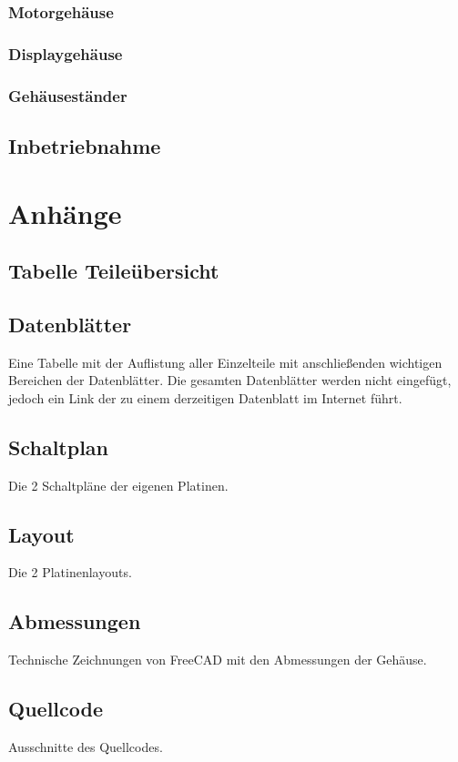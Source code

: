 \documentclass[11pt, titlepage, fleqn]{report}
\begin{document}
			\subsection{Motorgehäuse}
			\subsection{Displaygehäuse}
			\subsection{Gehäuseständer}
		\section{Inbetriebnahme}
	\chapter{Anhänge}
		\section{Tabelle Teileübersicht}
		\section{Datenblätter}
			Eine Tabelle mit der Auflistung aller Einzelteile mit anschließenden wichtigen Bereichen der Datenblätter.
			Die gesamten Datenblätter werden nicht eingefügt, jedoch ein Link der zu einem derzeitigen Datenblatt im Internet führt.
		\section{Schaltplan}
			Die 2 Schaltpläne der eigenen Platinen.
		\section{Layout}
			Die 2 Platinenlayouts.
		\section{Abmessungen}
			Technische Zeichnungen von FreeCAD mit den Abmessungen der Gehäuse.
		\section{Quellcode}
			Ausschnitte des Quellcodes.
	
\end{document}
